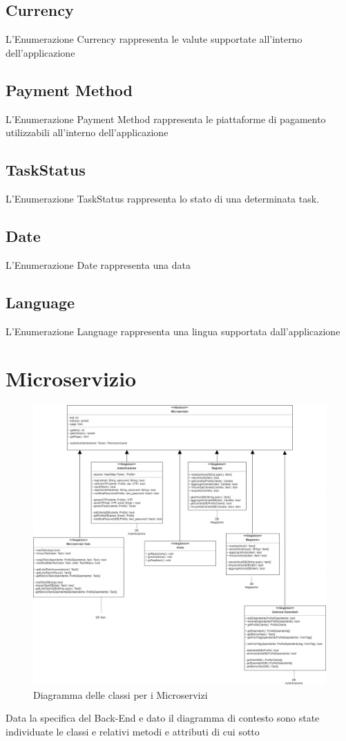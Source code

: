 \documentclass{report}
\begin{document}
\subsection*{Currency}
L'Enumerazione Currency rappresenta le valute supportate all'interno dell'applicazione
\subsection*{Payment Method}
L'Enumerazione Payment Method rappresenta le piattaforme di pagamento utilizzabili all'interno dell'applicazione 
\subsection*{TaskStatus}
L'Enumerazione TaskStatus rappresenta lo stato di una determinata task.
\subsection*{Date}
L'Enumerazione Date rappresenta una data
\subsection*{Language}
L'Enumerazione Language rappresenta una lingua supportata dall'applicazione

\section{Microservizio}
\begin{figure}[H]
	\centering\includegraphics[width=1\textwidth]{images/Diagramma_delle_classi_Microservizio.png}
	Diagramma delle classi per i Microservizi
\end{figure}
Data la specifica del Back-End e dato il diagramma di contesto sono state individuate le classi e relativi metodi e attributi di cui sotto
\end{document}

